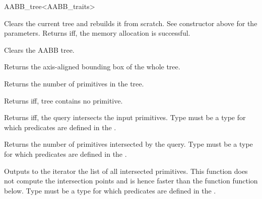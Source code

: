 \begin{ccRefClass}{AABB_tree<AABB_traits>}
\ccOperations

{Clears the current tree and rebuilds it from scratch. See constructor above for the parameters. Returns  iff, the memory allocation is successful. }

{Clears the AABB tree. }

{Returns the axis-aligned bounding box of the whole tree. }

{Returns the number of primitives in the tree. }

{Returns  iff, tree contains no primitive. }


{ Returns  iff, the query intersects the input primitives. Type  must be a type for which  predicates are defined in the .}
	
{Returns the number of primitives intersected by the query. Type  must be a type for which  predicates are defined in the .}


{Outputs to the iterator the list of all intersected primitives. This function does not compute the intersection points and is hence faster than the function  function below. Type  must be a type for which  predicates are defined in the .}


\end{ccRefClass}
